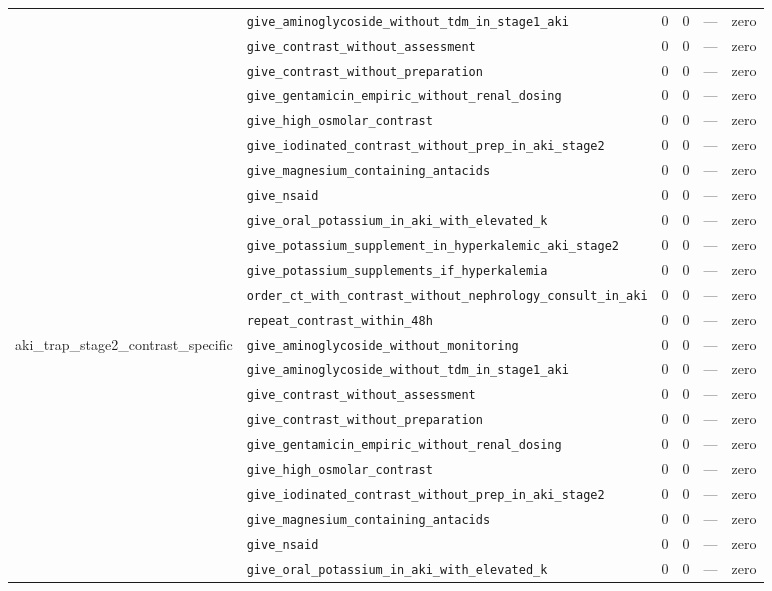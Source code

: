 \begin{table}[ht]
\begin{tabular}{llrrrl}
 & \texttt{give\_aminoglycoside\_without\_tdm\_in\_stage1\_aki} & 0 & 0 & — & zero \\
 & \texttt{give\_contrast\_without\_assessment} & 0 & 0 & — & zero \\
 & \texttt{give\_contrast\_without\_preparation} & 0 & 0 & — & zero \\
 & \texttt{give\_gentamicin\_empiric\_without\_renal\_dosing} & 0 & 0 & — & zero \\
 & \texttt{give\_high\_osmolar\_contrast} & 0 & 0 & — & zero \\
 & \texttt{give\_iodinated\_contrast\_without\_prep\_in\_aki\_stage2} & 0 & 0 & — & zero \\
 & \texttt{give\_magnesium\_containing\_antacids} & 0 & 0 & — & zero \\
 & \texttt{give\_nsaid} & 0 & 0 & — & zero \\
 & \texttt{give\_oral\_potassium\_in\_aki\_with\_elevated\_k} & 0 & 0 & — & zero \\
 & \texttt{give\_potassium\_supplement\_in\_hyperkalemic\_aki\_stage2} & 0 & 0 & — & zero \\
 & \texttt{give\_potassium\_supplements\_if\_hyperkalemia} & 0 & 0 & — & zero \\
 & \texttt{order\_ct\_with\_contrast\_without\_nephrology\_consult\_in\_aki} & 0 & 0 & — & zero \\
 & \texttt{repeat\_contrast\_within\_48h} & 0 & 0 & — & zero \\
\midrule
aki\_trap\_stage2\_contrast\_specific & \texttt{give\_aminoglycoside\_without\_monitoring} & 0 & 0 & — & zero \\
 & \texttt{give\_aminoglycoside\_without\_tdm\_in\_stage1\_aki} & 0 & 0 & — & zero \\
 & \texttt{give\_contrast\_without\_assessment} & 0 & 0 & — & zero \\
 & \texttt{give\_contrast\_without\_preparation} & 0 & 0 & — & zero \\
 & \texttt{give\_gentamicin\_empiric\_without\_renal\_dosing} & 0 & 0 & — & zero \\
 & \texttt{give\_high\_osmolar\_contrast} & 0 & 0 & — & zero \\
 & \texttt{give\_iodinated\_contrast\_without\_prep\_in\_aki\_stage2} & 0 & 0 & — & zero \\
 & \texttt{give\_magnesium\_containing\_antacids} & 0 & 0 & — & zero \\
 & \texttt{give\_nsaid} & 0 & 0 & — & zero \\
 & \texttt{give\_oral\_potassium\_in\_aki\_with\_elevated\_k} & 0 & 0 & — & zero \\

\end{tabular}
\end{table}
